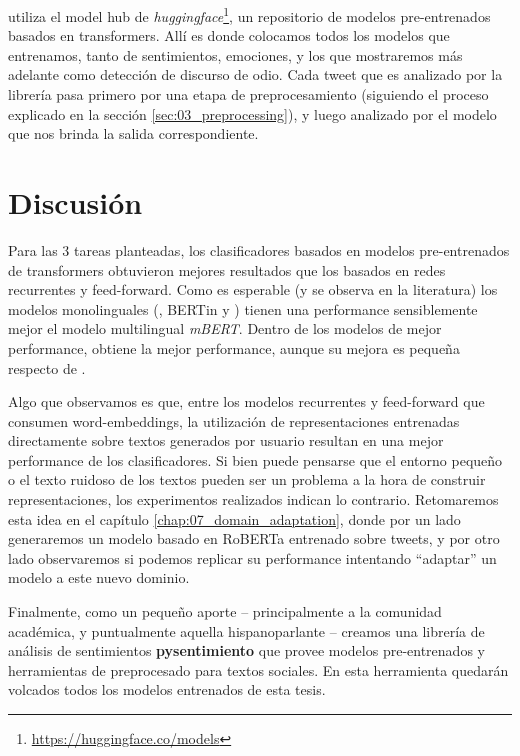 \pysentimiento{} utiliza el model hub de \emph{huggingface}\footnote{\url{https://huggingface.co/models}}, un repositorio de modelos pre-entrenados basados en transformers. Allí es donde colocamos todos los modelos que entrenamos, tanto de sentimientos, emociones, y los que mostraremos más adelante como detección de discurso de odio. Cada tweet que es analizado por la librería pasa primero por una etapa de preprocesamiento (siguiendo el proceso explicado en la sección \ref{sec:03_preprocessing}), y luego analizado por el modelo que nos brinda la salida correspondiente.


%
%
%

\section{Discusión}

Para las 3 tareas planteadas, los clasificadores basados en modelos pre-entrenados de transformers obtuvieron mejores resultados que los basados en redes recurrentes y feed-forward. Como es esperable (y se observa en la literatura) los modelos monolinguales (\roberta{}, BERTin y \beto{}) tienen una performance sensiblemente mejor el modelo multilingual \emph{mBERT}. Dentro de los modelos de mejor performance, \roberta{} obtiene la mejor performance, aunque su mejora es pequeña respecto de \beto{}.

Algo que observamos es que, entre los modelos recurrentes y feed-forward que consumen word-embeddings, la utilización de representaciones entrenadas directamente sobre textos generados por usuario resultan en una mejor performance de los clasificadores. Si bien puede pensarse que el entorno pequeño o el texto ruidoso de los textos pueden ser un problema a la hora de construir representaciones, los experimentos realizados indican lo contrario. Retomaremos esta idea en el capítulo \ref{chap:07_domain_adaptation}, donde por un lado generaremos un modelo basado en RoBERTa entrenado sobre tweets, y por otro lado observaremos si podemos replicar su performance intentando ``adaptar'' un modelo \beto{} a este nuevo dominio.

Finalmente, como un pequeño aporte -- principalmente a la comunidad académica, y puntualmente aquella hispanoparlante -- creamos una librería de análisis de sentimientos \textbf{pysentimiento} que provee modelos pre-entrenados y herramientas de preprocesado para textos sociales. En esta herramienta quedarán volcados todos los modelos entrenados de esta tesis.

